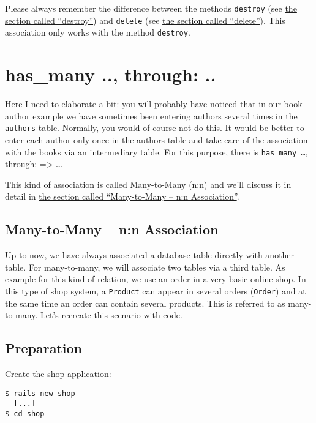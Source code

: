\documentclass[a4paper]{book}
\newcounter{tab}[chapter]
\begin{document}
Please always remember the difference between the methods \texttt{destroy} (see \hyperref[activerecordux5fdestroy]{the section called “destroy”}) and \texttt{delete} (see \hyperref[activerecordux5fdelete]{the section called “delete”}). This association only works with the method \texttt{destroy}.

\section{has\_many .., through: ..}\label{hasux5fmany-..-through-..}

Here I need to elaborate a bit: you will probably have noticed that in our book-author example we have sometimes been entering authors several times in the \texttt{authors} table. Normally, you would of course not do this. It would be better to enter each author only once in the authors table and take care of the association with the books via an intermediary table. For this purpose, there is \texttt{has\_many \ldots{}}, through: =\textgreater{} \emph{\texttt{\ldots{}}}.

This kind of association is called Many-to-Many (n:n) and we'll discuss it in detail in \hyperref[ar-manyux5ftoux5fmany]{the section called “Many-to-Many -- n:n Association”}.

\subsection{Many-to-Many -- n:n Association}\label{many-to-many-nn-association}

Up to now, we have always associated a database table directly with another table. For many-to-many, we will associate two tables via a third table. As example for this kind of relation, we use an order in a very basic online shop. In this type of shop system, a \texttt{Product} can appear in several orders (\texttt{Order}) and at the same time an order can contain several products. This is referred to as many-to-many. Let's recreate this scenario with code.

\subsection{Preparation}\label{preparation}

Create the shop application:

\begin{shaded}\begin{verbatim}
$ rails new shop
  [...]
$ cd shop
\end{verbatim}\end{shaded}
\end{document}

